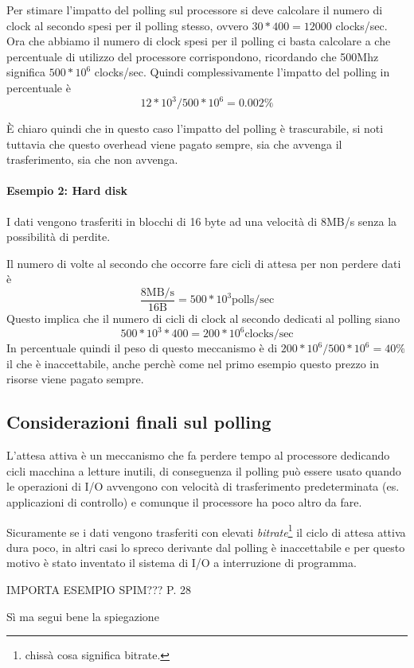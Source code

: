 \documentclass[class=book, crop=false, oneside]{standalone}
\begin{document}
Per stimare l'impatto del polling sul processore si deve calcolare il numero di clock al secondo spesi per il polling stesso, ovvero \(30*400 = 12000\) clocks/sec.
Ora che abbiamo il numero di clock spesi per il polling ci basta calcolare a che percentuale di utilizzo del processore corrispondono, ricordando che 500Mhz significa \(500*10^{6}\) clocks/sec.
Quindi complessivamente l'impatto del polling in percentuale è \[12*10^{3}/500*10^{6}=0.002\%\]

È chiaro quindi che in questo caso l'impatto del polling è trascurabile, si noti tuttavia che questo overhead viene pagato sempre, sia che avvenga il trasferimento, sia che non avvenga.

\paragraph{Esempio 2: Hard disk} I dati vengono trasferiti in blocchi di 16 byte ad una velocità di 8MB/s senza la possibilità di perdite.

Il numero di volte al secondo che occorre fare cicli di attesa per non perdere dati è \[\frac{8\textrm{MB/s}}{16\textrm{B}} = 500*10^{3} \textrm{polls/sec}\]
Questo implica che il numero di cicli di clock al secondo dedicati al polling siano \[ 500*10^{3}*400 = 200*10^{6} \textrm{clocks/sec}\]
In percentuale quindi il peso di questo meccanismo è di \(200*10^{6}/500*10^{6}=40\%\) il che è inaccettabile, anche perchè come nel primo esempio questo prezzo in risorse viene pagato sempre.

\subsection{Considerazioni finali sul polling}
L’attesa attiva è un meccanismo che fa perdere tempo al processore dedicando cicli macchina a letture inutili, di conseguenza il polling può essere usato quando le operazioni di I/O avvengono con velocità di trasferimento predeterminata (es. applicazioni di controllo) e comunque il processore ha poco altro da fare.

Sicuramente se i dati vengono trasferiti con elevati \emph{bitrate}\footnote{chissà cosa significa bitrate.} il ciclo di attesa attiva dura poco, in altri casi lo spreco derivante dal polling è inaccettabile e per questo motivo è stato inventato il sistema di I/O a interruzione di programma.

IMPORTA ESEMPIO SPIM??? P. 28

Sì ma segui bene la spiegazione
\end{document}
